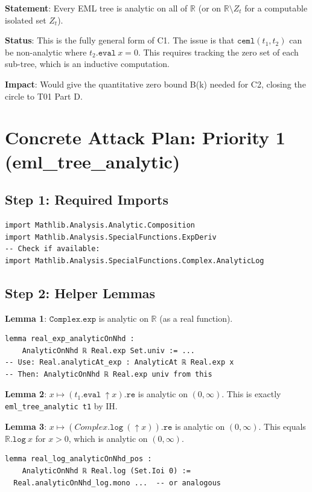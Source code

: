 \documentclass[12pt]{article}
\theoremstyle{definition}
\begin{document}
\textbf{Statement}: Every EML tree is analytic on all of $\mathbb{R}$ (or on $\mathbb{R} \setminus Z_t$
for a computable isolated set $Z_t$).

\textbf{Status}: This is the fully general form of C1. The issue is that
$\texttt{ceml}(t_1, t_2)$ can be non-analytic where $t_2.\texttt{eval}\ x = 0$.
This requires tracking the zero set of each sub-tree, which is an inductive computation.

\textbf{Impact}: Would give the quantitative zero bound B(k) needed for C2, closing the
circle to T01 Part D.

\section{Concrete Attack Plan: Priority 1 (eml\_tree\_analytic)}

\subsection{Step 1: Required Imports}
\begin{verbatim}
import Mathlib.Analysis.Analytic.Composition
import Mathlib.Analysis.SpecialFunctions.ExpDeriv
-- Check if available:
import Mathlib.Analysis.SpecialFunctions.Complex.AnalyticLog
\end{verbatim}

\subsection{Step 2: Helper Lemmas}

\textbf{Lemma 1}: $\texttt{Complex.exp}$ is analytic on $\mathbb{R}$ (as a real function).
\begin{verbatim}
lemma real_exp_analyticOnNhd :
    AnalyticOnNhd ℝ Real.exp Set.univ := ...
-- Use: Real.analyticAt_exp : AnalyticAt ℝ Real.exp x
-- Then: AnalyticOnNhd ℝ Real.exp univ from this
\end{verbatim}

\textbf{Lemma 2}: $x \mapsto (t_1.\texttt{eval}\ \uparrow x).\texttt{re}$ is analytic on $(0,\infty)$.
This is exactly \texttt{eml\_tree\_analytic t1} by IH.

\textbf{Lemma 3}: $x \mapsto (Complex.\texttt{log}\ (\uparrow x)).\texttt{re}$ is analytic on $(0,\infty)$.
This equals $\mathbb{R}.\texttt{log}\ x$ for $x > 0$, which is analytic on $(0,\infty)$.
\begin{verbatim}
lemma real_log_analyticOnNhd_pos :
    AnalyticOnNhd ℝ Real.log (Set.Ioi 0) :=
  Real.analyticOnNhd_log.mono ...  -- or analogous
\end{verbatim}
\end{document}
